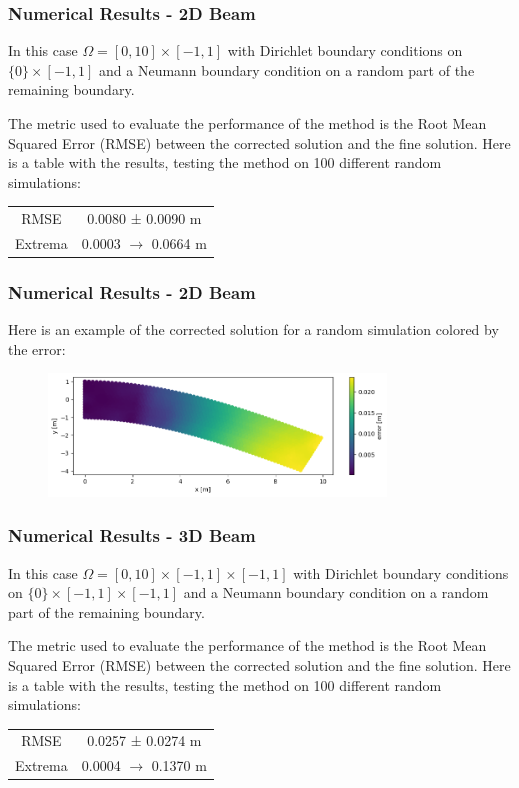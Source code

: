 \documentclass{beamer}
\begin{document}
\begin{frame}
    \frametitle{Numerical Results - 2D Beam}
    In this case \( \Omega = [0, 10] \times [-1, 1] \) with Dirichlet boundary conditions on \(\{0\} \times [-1, 1]\) and a Neumann boundary condition on a random part of the remaining boundary.
    \vspace{0.5cm}

    The metric used to evaluate the performance of the method is the Root Mean Squared Error (RMSE) between the corrected solution and the fine solution.
    Here is a table with the results, testing the method on 100 different random simulations:
    \begin{table}
        \centering
        \begin{tabular}{|c|c|}
            \hline
            RMSE & 0.0080 ± 0.0090 m \\
            Extrema & 0.0003 \(\rightarrow\) 0.0664 m \\
            \hline
        \end{tabular}
    \end{table}
\end{frame}

\begin{frame}
    \frametitle{Numerical Results - 2D Beam}
    Here is an example of the corrected solution for a random simulation colored by the error:
    \begin{figure}
        \centering
        \includegraphics[width=0.8\textwidth]{Images/output_2D_beam.png}
    \end{figure}
\end{frame}

\begin{frame}
    \frametitle{Numerical Results - 3D Beam}
    In this case \( \Omega = [0, 10] \times [-1, 1] \times [-1, 1] \) with Dirichlet boundary conditions on \(\{0\} \times [-1, 1] \times [-1, 1]\) and a Neumann boundary condition on a random part of the remaining boundary.
    \vspace{0.5cm}

    The metric used to evaluate the performance of the method is the Root Mean Squared Error (RMSE) between the corrected solution and the fine solution.
    Here is a table with the results, testing the method on 100 different random simulations:
    \begin{table}
        \centering
        \begin{tabular}{|c|c|}
            \hline
            RMSE & 0.0257 ± 0.0274 m \\
            Extrema & 0.0004 \(\rightarrow\) 0.1370 m \\
            \hline
        \end{tabular}
    \end{table}
\end{frame}
\end{document}
